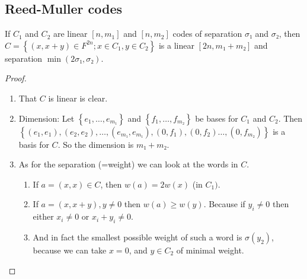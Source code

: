 \documentclass[english]{lbscript}
\begin{document}
\subsection{Reed-Muller codes}
\label{sec:reed-muller-codes}


\begin{theorem}{}{}
	If \(C_1\) and \(C_2\) are linear \(\left[ n, m_1 \right]\) and \([n, m_2]\)  codes of separation \(𝜎₁\) and \(𝜎₂\), then \(C= \left\{ (x, x+y)∈F^{2n}; x∈C_1, y∈C_2 \right\} \) is a linear \([2n, m₁+m₂]\) and separation \(\min(2𝜎₁, 𝜎₂)\).
\end{theorem}
\begin{proof}
	\begin{enumerate}
		\item\label{item:79} That \(C\) is linear is clear.
		\item\label{item:80} Dimension: Let \(\left\{ e_1, \dots, e_{m₁} \right\} \) and \(\left\{ f_1, \dots, f_{m₂} \right\} \) be bases for \(C_1\) and \(C_2\). Then \(\left\{ (e_1, e_1), (e_2,e_2), \dots, (e_{m₁}, e_{m₁}), (0, f_1), (0, f_2) \dots, (0, f_{m₂}) \right\} \) is a basis for \(C\). So the dimension is \(m₁+m₂\).

		\item\label{item:81}   As for the separation (=weight) we can look at the words in \(C\).
		\begin{enumerate}
			\item\label{item:75} If \(a=(x,x)∈C\), then \(w(a)=2w(x)\) (in \(C_1)\).
			\item\label{item:76} If \(a=(x,x+y), y≠0\) then \(w(a)≥w(y)\). Because if \(y_i≠0\) then either \(x_i≠0\) or \(x_i+y_i≠0\).
			\item\label{item:78} And in fact the smallest possible weight of such a word is \(𝜎(y_2)\), because we can take \(x=0\), and \(y∈C_2\) of minimal weight.
		\end{enumerate}
	\end{enumerate}
\end{proof}
\end{document}
